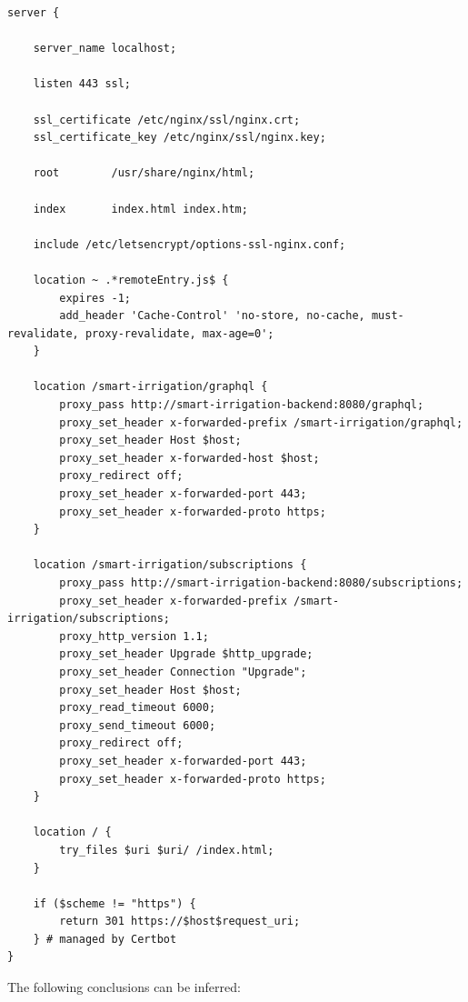 \begin{lstlisting}[caption=Configuration File for Production Environment, label={code:implementation:description:nginx:irrig}]
server {

    server_name localhost;

    listen 443 ssl;

    ssl_certificate /etc/nginx/ssl/nginx.crt;
    ssl_certificate_key /etc/nginx/ssl/nginx.key;

    root        /usr/share/nginx/html;

    index       index.html index.htm;

    include /etc/letsencrypt/options-ssl-nginx.conf;

    location ~ .*remoteEntry.js$ {
        expires -1;
        add_header 'Cache-Control' 'no-store, no-cache, must-revalidate, proxy-revalidate, max-age=0';
    }

    location /smart-irrigation/graphql {
        proxy_pass http://smart-irrigation-backend:8080/graphql;
        proxy_set_header x-forwarded-prefix /smart-irrigation/graphql;
        proxy_set_header Host $host;
        proxy_set_header x-forwarded-host $host;
        proxy_redirect off;
        proxy_set_header x-forwarded-port 443;
        proxy_set_header x-forwarded-proto https;
    }

    location /smart-irrigation/subscriptions {
        proxy_pass http://smart-irrigation-backend:8080/subscriptions;
        proxy_set_header x-forwarded-prefix /smart-irrigation/subscriptions;
        proxy_http_version 1.1;
        proxy_set_header Upgrade $http_upgrade;
        proxy_set_header Connection "Upgrade";
        proxy_set_header Host $host;
        proxy_read_timeout 6000;
        proxy_send_timeout 6000;
        proxy_redirect off;
        proxy_set_header x-forwarded-port 443;
        proxy_set_header x-forwarded-proto https;
    }

    location / {
        try_files $uri $uri/ /index.html;
    }

    if ($scheme != "https") {
        return 301 https://$host$request_uri;
    } # managed by Certbot
}
\end{lstlisting}

The following conclusions can be inferred:


